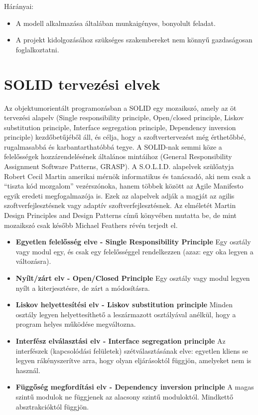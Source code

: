 \documentclass[margin=0px]{article}
\begin{document}
\begin{enumerate}
          Hárányai:
          \begin{itemize}
              \item A modell alkalmazása általában munkaigényes, bonyolult feladat.
              \item A projekt kidolgozásához szükséges szakembereket nem könnyű
                    gazdaságosan foglalkoztatni.
          \end{itemize}
\end{enumerate}

\section{SOLID tervezési elvek}
Az objektumorientált programozásban a SOLID egy mozaikszó, amely az öt tervezési alapelv (Single responsibility principle, Open/closed principle, Liskov substitution principle, Interface segregation principle, Dependency inversion principle) kezdőbetűjéből áll, és célja, hogy a szoftvertervezést még érthetőbbé, rugalmasabbá és karbantarthatóbbá tegye. A SOLID-nak semmi köze a felelősségek hozzárendelésének általános mintáihoz (General Responsibility Assignment Software Patterns, GRASP). A S.O.L.I.D. alapelvek szülőatyja Robert Cecil Martin amerikai mérnök informatikus és tanácsadó, aki nem csak a ``tiszta kód mozgalom'' vezérszónoka, hanem többek között az Agile Manifesto egyik eredeti megfogalmazója is. Ezek az alapelvek adják a magját az agilis szoftverfejlesztésnek vagy adaptív szoftverfejlesztésnek. Az elméletét Martin Design Principles and Design Patterns című könyvében mutatta be, de mint mozaikszó csak később Michael Feathers révén terjedt el.

\begin{itemize}
    \item {\textbf {Egyetlen felelősség elve - Single Responsibility Principle}} Egy osztály vagy modul egy, és csak egy felelősséggel rendelkezzen (azaz: egy oka legyen a változásra).
    \item {\textbf {Nyílt/zárt elv - Open/Closed Principle}} Egy osztály vagy modul legyen nyílt a kiterjesztésre, de zárt a módosításra.
    \item {\textbf {Liskov helyettesítési elv - Liskov substitution principle}} Minden osztály legyen helyettesíthető a leszármazott osztályával anélkül, hogy a program helyes működése megváltozna.
    \item {\textbf {Interfész elválasztási elv - Interface segregation principle}} Az interfészek (kapcsolódási felületek) szétválasztásának elve: egyetlen kliens se legyen rákényszerítve arra, hogy olyan eljárásoktól függjön, amelyeket nem is használ.
    \item {\textbf {Függőség megfordítási elv - Dependency inversion principle}} A magas szintű modulok ne függjenek az alacsony szintű moduloktól. Mindkettő absztrakcióktól függjön.
\end{itemize}
\end{document}
